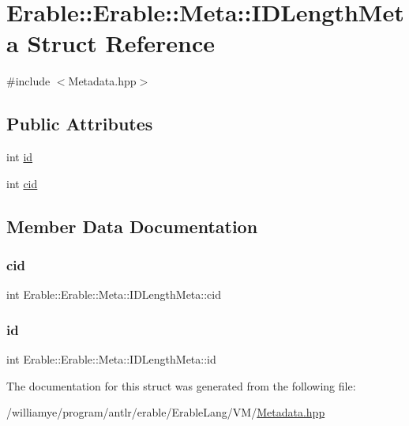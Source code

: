 \hypertarget{struct_erable_1_1_erable_1_1_meta_1_1_i_d_length_meta}{}\section{Erable\+::Erable\+::Meta\+::I\+D\+Length\+Meta Struct Reference}
\label{struct_erable_1_1_erable_1_1_meta_1_1_i_d_length_meta}


{\ttfamily \#include $<$Metadata.\+hpp$>$}

\subsection*{Public Attributes}
\begin{DoxyCompactItemize}
\item 
int \mbox{\hyperlink{struct_erable_1_1_erable_1_1_meta_1_1_i_d_length_meta_a8f91a45b6a95e5b0d7716663dde3687d}{id}}
\item 
int \mbox{\hyperlink{struct_erable_1_1_erable_1_1_meta_1_1_i_d_length_meta_a9ee969f92c8586e3ca9088d518c48f6c}{cid}}
\end{DoxyCompactItemize}


\subsection{Member Data Documentation}
\mbox{\label{struct_erable_1_1_erable_1_1_meta_1_1_i_d_length_meta_a9ee969f92c8586e3ca9088d518c48f6c}} 
\subsubsection{\texorpdfstring{cid}{cid}}
{\footnotesize\ttfamily int Erable\+::\+Erable\+::\+Meta\+::\+I\+D\+Length\+Meta\+::cid}

\mbox{\label{struct_erable_1_1_erable_1_1_meta_1_1_i_d_length_meta_a8f91a45b6a95e5b0d7716663dde3687d}} 
\subsubsection{\texorpdfstring{id}{id}}
{\footnotesize\ttfamily int Erable\+::\+Erable\+::\+Meta\+::\+I\+D\+Length\+Meta\+::id}



The documentation for this struct was generated from the following file\+:\begin{DoxyCompactItemize}
\item 
/williamye/program/antlr/erable/\+Erable\+Lang/\+V\+M/\mbox{\hyperlink{_metadata_8hpp}{Metadata.\+hpp}}\end{DoxyCompactItemize}
